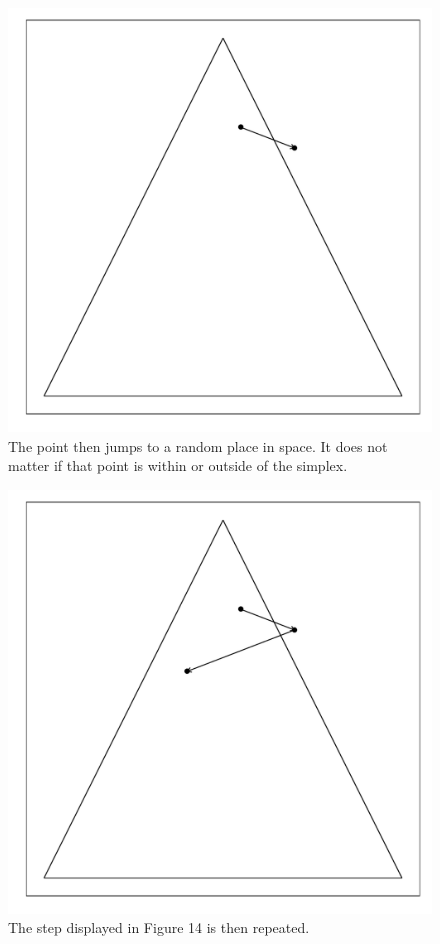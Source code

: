 \documentclass{article}\usepackage{graphicx, color}
\makeatletter
\def\maxwidth{ %
  \ifdim\Gin@nat@width>\linewidth
    \linewidth
  \else
    \Gin@nat@width
  \fi
}
\newenvironment{knitrout}{}{} %
\makeatother
\begin{document}
\begin{figure}[H]
\begin{knitrout}
\color{fgcolor}
\includegraphics[width=\maxwidth]{figure/mirror_walkthrough2} 

\end{knitrout}

\caption{The point then jumps to a random place in space. It does not matter if that point is within or outside of the simplex.}
\end{figure}

\begin{figure}[H]
\begin{knitrout}
\color{fgcolor}
\includegraphics[width=\maxwidth]{figure/mirror_walkthrough3} 

\end{knitrout}

\caption{The step displayed in Figure 14 is then repeated.}
\end{figure}
\end{document}
